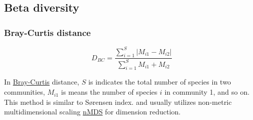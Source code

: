 \documentclass[
]{article}
\begin{document}
\hypertarget{beta-diversity}{%
\subsection{Beta diversity}\label{beta-diversity}}

\hypertarget{bray-curtis-distance}{%
\subsubsection{Bray-Curtis distance}\label{bray-curtis-distance}}

\[ D_{BC} = \frac{\sum_{i=1}^S{|M_{i1} - M_{i2}|}}{\sum_{i=1}^S{M_{i1} + M_{i2}}} \]

In
\href{https://esajournals.onlinelibrary.wiley.com/doi/10.2307/1942268}{Bray-Curtis}
distance, \(S\) is indicates the total number of species in two
communities, \(M_{i1}\) is means the number of species \(i\) in
community 1, and so on. This method is similar to Sørensen index. and
usually utilizes non-metric multidimensional scaling
\href{https://strata.uga.edu/software/pdf/mdsTutorial.pdf}{nMDS} for
dimension reduction.
\end{document}
